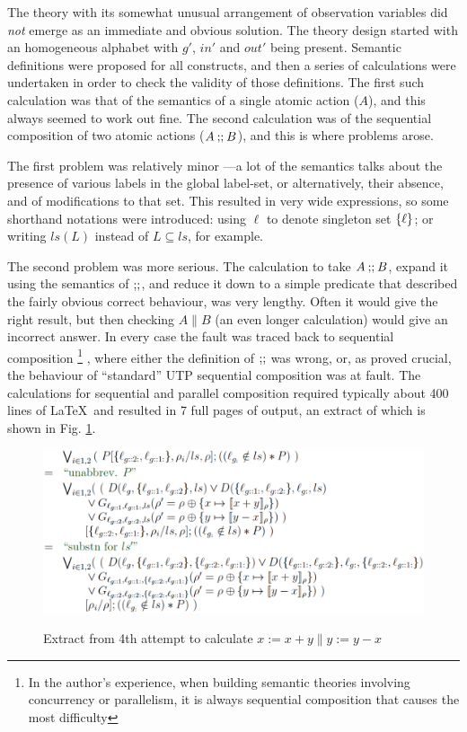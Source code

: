 The theory with its somewhat unusual arrangement of observation variables
did \emph{not} emerge as an immediate and obvious solution.
The theory design started with an homogeneous alphabet with $g'$, $in'$ and $out'$
being present.
Semantic definitions were proposed for all constructs,
and then a series of calculations were undertaken in order to check
the validity of those definitions.
The first such calculation was that of the semantics of a single atomic
action ($A$), and this always seemed to work out fine.
The second calculation was of the sequential composition of two atomic
actions ($A\mathbin{\mathbf{;\!;}} B$), and this is where problems arose.

The first problem was relatively minor
---a lot of the semantics talks about the presence of various
labels in the global label-set, or alternatively, their  absence,
and of modifications to that set.
This resulted in very wide expressions,
so some shorthand notations were introduced:
using $\ell$ to denote singleton set $\{{\ell}\}$;
or writing $ls(L)$ instead of $L \subseteq ls$, for example.

The second problem was more serious.
The calculation to take $A \mathbin{\mathbf{;\!;}} B$,
expand it using the semantics of $\mathbin{\mathbf{;\!;}}$,
and reduce it down to a simple predicate that described the fairly obvious
correct behaviour,
was very lengthy.
Often it would give the right result,
but then checking $A \parallel B$ (an even longer calculation)
would give an incorrect answer.
In every case the fault was traced back to sequential composition%
\footnote{
In the author's experience,
when building semantic theories involving concurrency or parallelism,
it is always sequential composition that causes the most difficulty
}
,
where either the definition of $\mathbin{\mathbf{;\!;}}$ was wrong,
or, as proved crucial,
the behaviour of ``standard'' UTP sequential composition
was at fault.
The calculations for sequential and parallel composition
required typically about 400 lines of \LaTeX\ and resulted
in 7 full pages of output,
an extract of which is shown in Fig. \ref{fig:attempt4}.

\begin{figure}
  \centering
  \includegraphics[width=4.5in]{Attempt4.eps}\\
  \caption{Extract from 4th attempt to calculate $x:=x+y \parallel y:=y-x$}
  \label{fig:attempt4}
\end{figure}

